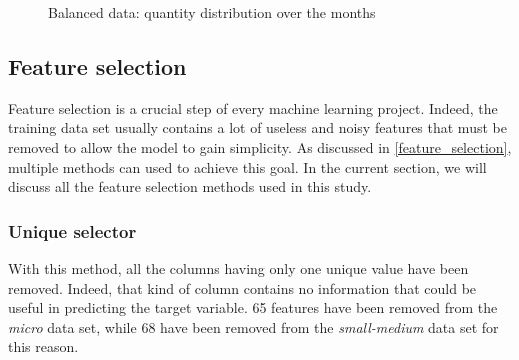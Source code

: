 \documentclass[LaM,binding=0.6cm, english]{sapthesis}
\begin{document}
\begin{figure}[!ht]
  \centering
  \hfill
  \caption{Balanced data: quantity distribution over the months}
\end{figure}

\subsection{Feature selection}

Feature selection is a crucial step of every machine learning project. Indeed, the training data set usually contains a lot of useless and noisy features that must be removed to allow the model to gain simplicity. As discussed in \ref{feature_selection}, multiple methods can used to achieve this goal. In the current section, we will discuss all the feature selection methods used in this study.

\subsubsection{Unique selector}

With this method, all the columns having only one unique value have been removed. Indeed, that kind of column contains no information that could be useful in predicting the target variable. 65 features have been removed from the \textit{micro} data set, while 68 have been removed from the \textit{small-medium} data set for this reason.
\end{document}
